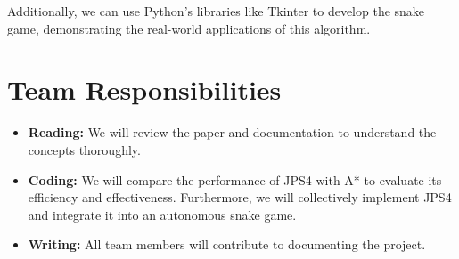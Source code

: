\documentclass{article}
\begin{document}
Additionally, we can use Python's libraries like Tkinter to develop the snake game, demonstrating the real-world applications of this algorithm.

\section{Team Responsibilities}
\begin{itemize}
    \item \textbf{Reading:} We will review the paper and documentation to understand the concepts thoroughly.
    \item \textbf{Coding:} We will compare the performance of JPS4 with A* to evaluate its efficiency and effectiveness. Furthermore, we will collectively implement JPS4 and integrate it into an autonomous snake game.
    \item \textbf{Writing:} All team members will contribute to documenting the project.
\end{itemize}
\end{document}
